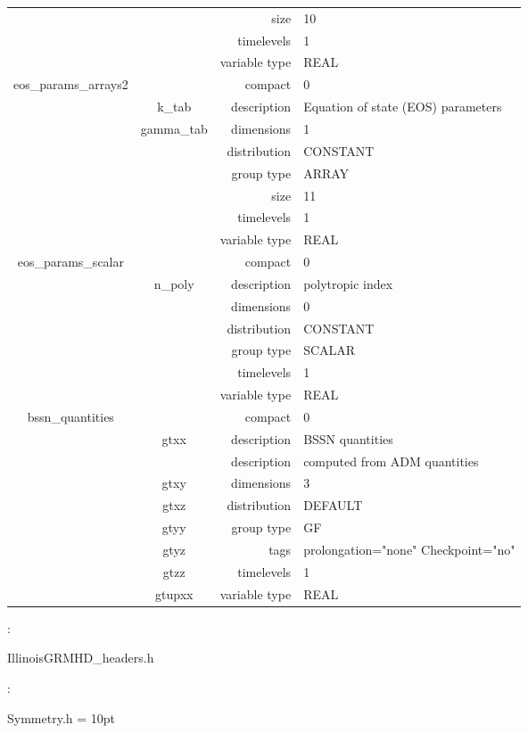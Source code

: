 \documentclass{article}
\begin{document}
\begin{tabular*}{150mm}{|c|c@{\extracolsep{\fill}}|rl|}
 &  & size & 10 \\ 
 &  & timelevels & 1 \\ 
 &  & variable type & REAL \\ 
\hline 
eos\_params\_arrays2 &  & compact & 0 \\ 
 & k\_tab & description & Equation of state (EOS) parameters \\ 
 & gamma\_tab & dimensions & 1 \\ 
 &  & distribution & CONSTANT \\ 
 &  & group type & ARRAY \\ 
 &  & size & 11 \\ 
 &  & timelevels & 1 \\ 
 &  & variable type & REAL \\ 
\hline 
eos\_params\_scalar &  & compact & 0 \\ 
 & n\_poly & description & polytropic index \\ 
 &  & dimensions & 0 \\ 
 &  & distribution & CONSTANT \\ 
 &  & group type & SCALAR \\ 
 &  & timelevels & 1 \\ 
 &  & variable type & REAL \\ 
\hline 
bssn\_quantities &  & compact & 0 \\ 
 & gtxx & description & BSSN quantities \\ 
& ~ & description &  computed from ADM quantities \\ 
 & gtxy & dimensions & 3 \\ 
 & gtxz & distribution & DEFAULT \\ 
 & gtyy & group type & GF \\ 
 & gtyz & tags & prolongation="none" Checkpoint="no" \\ 
 & gtzz & timelevels & 1 \\ 
 & gtupxx & variable type & REAL \\ 
\hline 
\end{tabular*} 



\vspace{5mm}

: 



IllinoisGRMHD\_headers.h
\vspace{2mm}

: 

Symmetry.h
\vspace{2mm}\parskip = 10pt 
\end{document}
